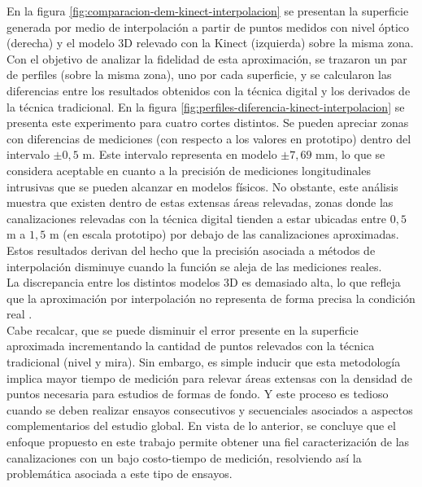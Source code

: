 En la figura \ref{fig:comparacion-dem-kinect-interpolacion} se presentan la superficie generada por medio de interpolación a partir de puntos medidos con nivel óptico (derecha) y el modelo 3D relevado con la Kinect (izquierda) sobre la misma zona. \\
Con el objetivo de analizar la fidelidad de esta aproximación, se trazaron un par de perfiles (sobre la misma zona), uno por cada superficie, y se calcularon las diferencias entre los resultados obtenidos con la técnica digital y los derivados de la técnica tradicional. En la figura \ref{fig:perfiles-diferencia-kinect-interpolacion} se presenta este experimento para cuatro cortes distintos. Se pueden apreciar zonas con diferencias de mediciones (con respecto a los valores en prototipo) dentro del intervalo $\pm0,5$ m. Este intervalo representa en modelo $\pm 7,69$ mm, lo que se considera aceptable en cuanto a la precisión de mediciones longitudinales intrusivas que se pueden alcanzar en modelos físicos. No obstante, este análisis muestra que existen dentro de estas extensas áreas relevadas, zonas donde las canalizaciones relevadas con la técnica digital tienden a estar ubicadas entre $0,5$ m a $1,5$ m (en escala prototipo) por debajo de las canalizaciones aproximadas. Estos resultados derivan del hecho que la precisión asociada a métodos de interpolación disminuye cuando la función se aleja de las mediciones reales. \\
La discrepancia entre los distintos modelos 3D es demasiado alta, lo que refleja que la aproximación por interpolación no representa de forma precisa la condición real . \\
Cabe recalcar, que se puede disminuir el error presente en la superficie aproximada incrementando la cantidad de puntos relevados con la técnica tradicional (nivel y mira). Sin embargo, es simple inducir que esta metodología implica mayor tiempo de medición para relevar áreas extensas con la densidad de puntos necesaria para estudios de formas de fondo. Y este proceso es tedioso cuando se deben realizar ensayos consecutivos y secuenciales asociados a aspectos complementarios del estudio global. En vista de lo anterior, se concluye que el enfoque propuesto en este trabajo permite obtener una fiel caracterización de las canalizaciones con un bajo costo-tiempo de medición, resolviendo así la problemática asociada a este tipo de ensayos. \\

